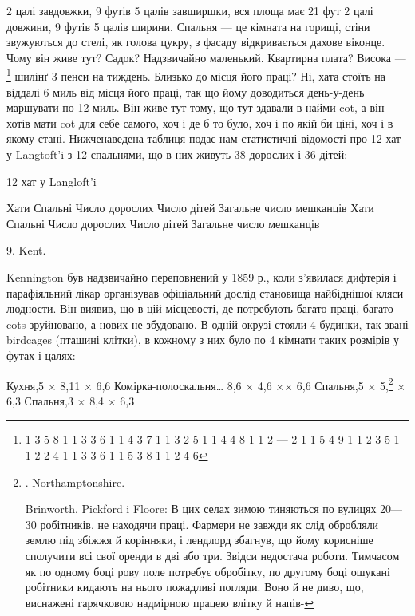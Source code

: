 \parcont{}  %
2 цалі завдовжки, 9 футів 5 цалів завширшки, вся площа має
21 фут 2 цалі довжини, 9 футів 5 цалів ширини. Спальня — це
кімната на горищі, стіни звужуються до стелі, як голова цукру,
з фасаду відкривається дахове віконце. Чому він живе тут?
Садок? Надзвичайно маленький. Квартирна плата? Висока —\footnote{
1    3    5    8    1    1    3    3    6
1    1    4    3    7    1    1    3    2    5
1    1    4    4    8    1    1    2    —   2
1    1    5    4    9    1    1    2    3    5
1    1    2    2    4    1    1    3    3    6
1    1    5    3    8    1    1    2    4    6
} шилінґ 3 пенси на тиждень. Близько до місця його праці?
Ні, хата стоїть на віддалі 6 миль від місця його праці, так що
йому доводиться день-у-день маршувати по 12 миль. Він живе
тут тому, що тут здавали в найми cot, а він хотів мати cot для
себе самого, хоч і де б то було, хоч і по якій би ціні, хоч і в якому
стані. Нижченаведена таблиця подає нам статистичні відомості
про 12 хат у Langtoft’i з 12 спальнями, що в них живуть 38 дорослих
і 36 дітей:

12 хат у Langloft’i

Хати   Спальні  Число дорослих    Число дітей    Загальне число мешканців    Хати    Спальні
Число дорослих    Число дітей    Загальне число мешканців

9. Kent.

Kennington був надзвичайно переповнений у 1859 р., коли
з’явилася дифтерія і парафіяльний лікар організував офіціальний
дослід становища найбіднішої кляси людности. Він виявив, що
в цій місцевості, де потребують багато праці, багато cots зруйновано,
а нових не збудовано. В одній окрузі стояли 4 будинки,
так звані birdcages (пташині клітки), в кожному з них було по
4 кімнати таких розмірів у футах і цалях:

Кухня,5 × 8,11 × 6,6
Комірка-полоскальня\dots{}      8,6 × 4,6 ×× 6,6
Спальня,5 × 5,\footnote{
. Northamptonshire.

Brinworth, Pickford i Floore: В цих селах зимою тиняються
по вулицях 20—30 робітників, не находячи праці. Фармери не
завжди як слід обробляли землю під збіжжя й корінняки, і лендлорд
збагнув, що йому корисніше сполучити всі свої оренди
в дві або три. Звідси недостача роботи. Тимчасом як по одному
боці рову поле потребує обробітку, по другому боці ошукані
робітники кидають на нього пожадливі погляди. Воно й не диво,
що, виснажені гарячковою надмірною працею влітку й напів-
} × 6,3
Спальня,3 × 8,4 × 6,3
\parbreak{}  %
